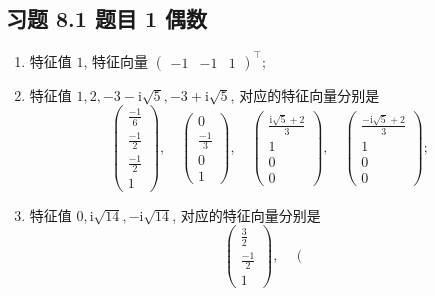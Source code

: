 \subsection*{ 习题 8.1 题目 1 偶数 }
\begin{solution}
\begin{enumerate}
    \item 特征值 $1$, 特征向量 $\left(\begin{matrix}
        -1 & -1 & 1
        \end{matrix}\right)^\top$;
    \item 特征值 $1, 2, -3 - \mathrm{i}\sqrt{5}, -3 + \mathrm{i}\sqrt{5}$, 对应的特征向量分别是
    \[
        \left(\begin{matrix}
            \frac{-1}{6} \\
            \frac{-1}{2} \\
            \frac{-1}{2} \\
            1
            \end{matrix}\right), \quad \left(\begin{matrix}
                0 \\
                \frac{-1}{3} \\
                0 \\
                1
                \end{matrix}\right), \quad \left(\begin{matrix}
                    \frac{\mathrm{i}\sqrt{5}+2}{3} \\
                    1 \\
                    0 \\
                    0
                    \end{matrix}\right), \quad \left(\begin{matrix}
                        \frac{-\mathrm{i}\sqrt{5}+2}{3} \\
                        1 \\
                        0 \\
                        0
                        \end{matrix}\right);
    \]
    \item 特征值 $0, \mathrm{i}\sqrt{14}, -\mathrm{i}\sqrt{14}$, 对应的特征向量分别是
    \[
        \left(\begin{matrix}
            \frac{3}{2} \\
            \frac{-1}{2} \\
            1
            \end{matrix}\right), \quad \left(\begin{matrix}

\end{matrix}\]
\end{enumerate}
\end{solution}
